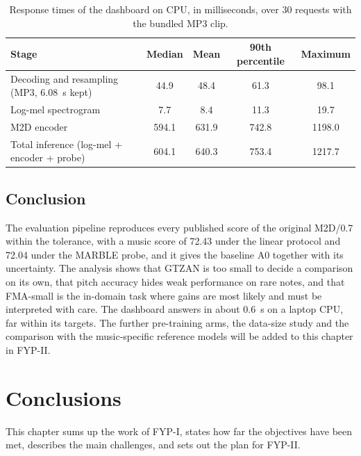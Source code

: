 \begin{table}[htbp]
\centering
\caption[Response times of the dashboard on CPU]{Response times of the dashboard on CPU, in milliseconds, over 30 requests with the bundled MP3 clip.}
\label{tab:res-latency}
\small\singlespacing
\begin{tabular}{lcccc}
\toprule
\textbf{Stage} & \textbf{Median} & \textbf{Mean} & \textbf{90th percentile} & \textbf{Maximum}\\
\midrule
Decoding and resampling (MP3, 6.08~s kept) & 44.9 & 48.4 & 61.3 & 98.1\\
Log-mel spectrogram & 7.7 & 8.4 & 11.3 & 19.7\\
M2D encoder & 594.1 & 631.9 & 742.8 & 1198.0\\
Total inference (log-mel + encoder + probe) & 604.1 & 640.3 & 753.4 & 1217.7\\
\bottomrule
\end{tabular}
\end{table}

\FloatBarrier
\section{Conclusion}
\label{sec:res-conclusion}
The evaluation pipeline reproduces every published score of the original M2D/0.7 within the tolerance, with a music score of 72.43 under the linear protocol and 72.04 under the MARBLE probe, and it gives the baseline A0 together with its uncertainty. The analysis shows that GTZAN is too small to decide a comparison on its own, that pitch accuracy hides weak performance on rare notes, and that FMA-small is the in-domain task where gains are most likely and must be interpreted with care. The dashboard answers in about 0.6~s on a laptop CPU, far within its targets. The further pre-training arms, the data-size study and the comparison with the music-specific reference models will be added to this chapter in FYP-II.

\chapter{Conclusions}
\label{ch:conclusions}
This chapter sums up the work of FYP-I, states how far the objectives have been met, describes the main challenges, and sets out the plan for FYP-II.

